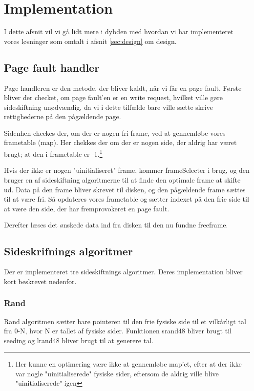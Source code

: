 \section{Implementation}
I dette afsnit vil vi gå lidt mere i dybden med hvordan vi har implementeret vores løsninger som omtalt i afsnit \ref{sec:design} om design.

\subsection{Page fault handler}
Page handleren er den metode, der bliver kaldt, når vi får en page fault. Første bliver der checket, om page fault'en er en write request, hvilket ville gøre sideskiftning unødvændig, da vi i dette tilfælde bare ville sætte skrive rettighederne på den pågældende page.

Sidenhen checkes der, om der er nogen fri frame, ved at gennemløbe vores frametable (map). Her chekkes der om der er nogen side, der aldrig har været brugt; at den i frametable er -1.\footnote{Her kunne en optimering være ikke at gennemløbe map'et, efter at der ikke var nogle "uinitialiserede" fysiske sider, eftersom de aldrig ville blive "uinitialiserede" igen}

Hvis der ikke er nogen "uinitialiseret" frame, kommer frameSelecter i brug, og den bruger en af sideskiftning algoritmerne til at finde den optimale frame at skifte ud. Data på den frame bliver skrevet til disken, og den pågældende frame sættes til at være fri. Så opdateres vores frametable og sætter indexet på den frie side til at være den side, der har fremprovokeret en page fault.

Derefter læses det ønskede data ind fra disken til den nu fundne freeframe.

\subsection{Sideskrifnings algoritmer}
Der er implementeret tre sideskiftnings algoritmer. Deres implementation bliver kort beskrevet nedenfor.

\subsubsection{Rand}
Rand algoritmen sætter bare pointeren til den frie fysiske side til et vilkårligt tal fra 0-N, hvor N er tallet af fysiske sider. Funktionen srand48 bliver brugt til seeding og lrand48 bliver brugt til at generere tal.

